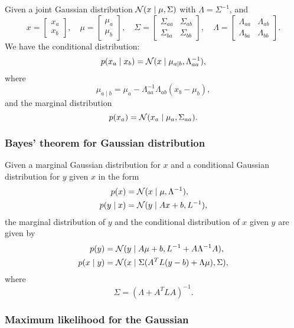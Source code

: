 \documentclass[a4paper]{article}
\begin{document}
\begin{thm}
Given a joint Gaussian distribution $\mathcal{N} (x \mid \mu,
\Sigma)$ with $\Lambda = \Sigma^{-1}$, and 
\[
x = \begin{bmatrix}
  x_a \\
  x_b
\end{bmatrix}, 
\quad 
\mu = \begin{bmatrix}
  \mu_a \\
  \mu_b
\end{bmatrix}, 
\quad 
\Sigma = \begin{bmatrix}
  \Sigma_{aa} & \Sigma_{ab} \\
  \Sigma_{ba} & \Sigma_{bb}
\end{bmatrix}, 
\quad 
\Lambda = \begin{bmatrix}
  \Lambda_{aa} & \Lambda_{ab} \\
  \Lambda_{ba} & \Lambda_{bb}
\end{bmatrix}.
\]
We have the conditional distribution: 
\[
p(x_a \mid x_b) 
= \mathcal{N} (x \mid \mu_{a \mid b}, \Lambda_{aa}^{-1}),
\]
where 
\[
\mu_{a \mid b} = \mu_a - \Lambda_{aa}^{-1} \Lambda_{ab} 
(x_b - \mu_b),
\]
and the marginal distribution 
\[
p(x_a) = \mathcal{N}(x_a \mid \mu_a, \Sigma_{aa}).
\] 
\end{thm}

\subsubsection{Bayes' theorem for Gaussian distribution}

\begin{thm}
Given a marginal Gaussian distribution for $x$ and a 
conditional Gaussian distribution for $y$ given $x$ in 
the form
\[
\begin{aligned}
p(x) &= \mathcal{N} (x \mid \mu, \Lambda^{-1}), \\
p(y \mid x) &= \mathcal{N} (y \mid A x + b, L^{-1}),
\end{aligned}
\]
the marginal distribution of $y$ and the conditional 
distribution of $x$ given $y$ are given by 
\[
\begin{aligned}
p(y) &= \mathcal{N} (y \mid A \mu + b, L^{-1} + A \Lambda^{-1} A), \\
p(x \mid y) &= \mathcal{N} (x \mid \Sigma (A^T L (y - b) + 
\Lambda \mu), \Sigma),
\end{aligned}
\]
where 
\[
\Sigma = (\Lambda + A^T L A)^{-1}.
\]
\end{thm}

\subsubsection{Maximum likelihood for the Gaussian}
\end{document}
